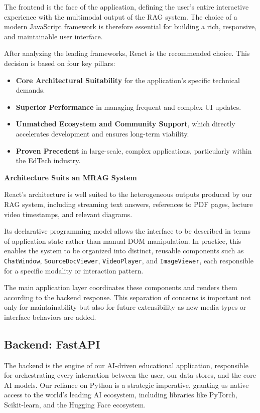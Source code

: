 The frontend is the face of the application, defining the user's entire interactive experience with the multimodal output of the RAG system. The choice of a modern JavaScript framework is therefore essential for building a rich, responsive, and maintainable user interface.

After analyzing the leading frameworks, React is the recommended choice. This decision is based on four key pillars:
\begin{itemize}
    \item \textbf{Core Architectural Suitability} for the application's specific technical demands.
    \item \textbf{Superior Performance} in managing frequent and complex UI updates.
    \item \textbf{Unmatched Ecosystem and Community Support}, which directly accelerates development and ensures long-term viability.
    \item \textbf{Proven Precedent} in large-scale, complex applications, particularly within the EdTech industry.
\end{itemize}

\textbf{Architecture Suits an MRAG System} 

React's architecture is well suited to the heterogeneous outputs produced by our RAG system, including streaming text answers, references to PDF pages, lecture video timestamps, and relevant diagrams.

Its declarative programming model allows the interface to be described in terms of application state rather than manual DOM manipulation. In practice, this enables the system to be organized into distinct, reusable components such as \texttt{ChatWindow}, \texttt{SourceDocViewer}, \texttt{VideoPlayer}, and \texttt{ImageViewer}, each responsible for a specific modality or interaction pattern.

The main application layer coordinates these components and renders them according to the backend response. This separation of concerns is important not only for maintainability but also for future extensibility as new media types or interface behaviors are added.

\subsection{Backend: FastAPI}

The backend is the engine of our AI-driven educational application, responsible for orchestrating every interaction between the user, our data stores, and the core AI models. Our reliance on Python is a strategic imperative, granting us native access to the world's leading AI ecosystem, including libraries like PyTorch, Scikit-learn, and the Hugging Face ecosystem.

